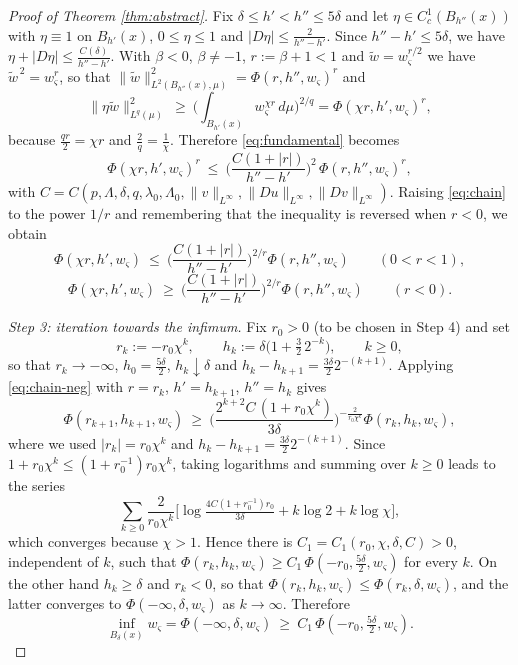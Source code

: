\documentclass[10pt,a4paper]{amsart}
\begin{document}
\begin{proof}[Proof of Theorem \ref{thm:abstract}]
Fix $\delta\le h'<h''\le5\delta$ and let $\eta\in C_c^1(B_{h''}(x))$ with $\eta\equiv1$ on
$B_{h'}(x)$, $0\le\eta\le1$ and $|D\eta|\le\frac{2}{h''-h'}$. Since $h''-h'\le5\delta$, we have
$\eta+|D\eta|\le\frac{C(\delta)}{h''-h'}$. With $\beta<0$, $\beta\ne-1$, $r:=\beta+1<1$ and
$\widetilde w=w_\varsigma^{r/2}$ we have $\widetilde w^{\,2}=w_\varsigma^{r}$, so that
$\|\widetilde w\|_{L^2(B_{h''}(x),\mu)}^2=\Phi(r,h'',w_\varsigma)^{r}$ and
\[
\|\eta\widetilde w\|^2_{L^{q}(\mu)}
\ \ge\ \Big(\int_{B_{h'}(x)}w_\varsigma^{\chi r}\,d\mu\Big)^{2/q}
=\Phi(\chi r,h',w_\varsigma)^{r} ,
\]
because $\frac{q r}{2}=\chi r$ and $\frac2q=\frac1\chi$. Therefore \eqref{eq:fundamental} becomes
\begin{equation}\label{eq:chain}
\Phi(\chi r,h',w_\varsigma)^{r}\ \le\ \Big(\frac{C(1+|r|)}{h''-h'}\Big)^{2}\,\Phi(r,h'',w_\varsigma)^{r},
\end{equation}
with $C=C(p,\Lambda,\delta,q,\lambda_0,\Lambda_0,\|v\|_{L^\infty},\|Du\|_{L^\infty},\|Dv\|_{L^\infty})$.
Raising \eqref{eq:chain} to the power $1/r$ and remembering that the inequality is reversed when
$r<0$, we obtain
\begin{equation}\label{eq:chain-pos}
\Phi(\chi r,h',w_\varsigma)\ \le\ \Big(\frac{C(1+|r|)}{h''-h'}\Big)^{2/r}\Phi(r,h'',w_\varsigma)
\qquad (0<r<1),
\end{equation}
\begin{equation}\label{eq:chain-neg}
\Phi(\chi r,h',w_\varsigma)\ \ge\ \Big(\frac{C(1+|r|)}{h''-h'}\Big)^{2/r}\Phi(r,h'',w_\varsigma)
\qquad (r<0).
\end{equation}

\emph{Step 3: iteration towards the infimum.} Fix $r_0>0$ (to be chosen in Step 4) and set
\[
r_k:=-r_0\chi^{k},\qquad h_k:=\delta\Big(1+\tfrac32\,2^{-k}\Big),\qquad k\ge0 ,
\]
so that $r_k\to-\infty$, $h_0=\frac{5\delta}{2}$, $h_k\downarrow\delta$ and
$h_k-h_{k+1}=\frac{3\delta}{2}2^{-(k+1)}$. Applying \eqref{eq:chain-neg} with $r=r_k$,
$h'=h_{k+1}$, $h''=h_k$ gives
\[
\Phi(r_{k+1},h_{k+1},w_\varsigma)\ \ge\
\Big(\frac{2^{k+2}C\,(1+r_0\chi^{k})}{3\delta}\Big)^{-\frac{2}{r_0\chi^{k}}}\Phi(r_k,h_k,w_\varsigma) ,
\]
where we used $|r_k|=r_0\chi^{k}$ and $h_k-h_{k+1}=\frac{3\delta}{2}2^{-(k+1)}$. Since
$1+r_0\chi^{k}\le(1+r_0^{-1})r_0\chi^{k}$, taking logarithms and summing over $k\ge0$ leads to the
series
\[
\sum_{k\ge0}\frac{2}{r_0\chi^{k}}\Big[\log\tfrac{4C(1+r_0^{-1})r_0}{3\delta}+k\log 2+k\log\chi\Big] ,
\]
which converges because $\chi>1$. Hence there is $C_1=C_1(r_0,\chi,\delta,C)>0$, independent of
$k$, such that $\Phi(r_k,h_k,w_\varsigma)\ge C_1\,\Phi(-r_0,\frac{5\delta}{2},w_\varsigma)$ for every
$k$. On the other hand $h_k\ge\delta$ and $r_k<0$, so that
$\Phi(r_k,h_k,w_\varsigma)\le\Phi(r_k,\delta,w_\varsigma)$, and the latter converges to
$\Phi(-\infty,\delta,w_\varsigma)$ as $k\to\infty$. Therefore
\begin{equation}\label{eq:toinf}
\inf_{B_{\delta}(x)}w_\varsigma=\Phi(-\infty,\delta,w_\varsigma)\ \ge\ C_1\,\Phi(-r_0,\tfrac{5\delta}{2},w_\varsigma).
\end{equation}


\end{proof}
\end{document}

